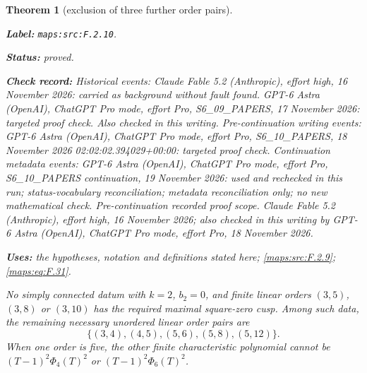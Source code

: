 \documentclass[11pt,a4paper]{article}
\newtheorem{theorem}{Theorem}[section]
\theoremstyle{definition}
\newcommand{\StatementRecord}[4]{\par\smallskip\begingroup\upshape\raggedright\noindent\textbf{Label:} \nolinkurl{#1}.\par\noindent\textbf{Status:} #2.\par\noindent\textbf{Check record:} #3.\par\noindent\textbf{Uses:} #4.\par\endgroup\smallskip}
\begin{document}
\begin{theorem}[exclusion of three further order pairs]\label{maps:src:F.2.10}
\StatementRecord{maps:src:F.2.10}{proved}{Historical events: Claude Fable 5.2 (Anthropic), effort high, 16 November 2026: carried as background without fault found. GPT-6 Astra (OpenAI), ChatGPT Pro mode, effort Pro, S6\_09\_PAPERS, 17 November 2026: targeted proof check. Also checked in this writing. Pre-continuation writing events: GPT-6 Astra (OpenAI), ChatGPT Pro mode, effort Pro, S6\_10\_PAPERS, 18 November 2026 02:02:02.394029+00:00: targeted proof check. Continuation metadata events: GPT-6 Astra (OpenAI), ChatGPT Pro mode, effort Pro, S6\_10\_PAPERS continuation, 19 November 2026: used and rechecked in this run; status-vocabulary reconciliation; metadata reconciliation only; no new mathematical check. \emph{Pre-continuation recorded proof scope.} Claude Fable 5.2 (Anthropic), effort high, 16 November 2026; also checked in this writing by GPT-6 Astra (OpenAI), ChatGPT Pro mode, effort Pro, 18 November 2026}{the hypotheses, notation and definitions stated here; \cref{maps:src:F.2.9}; \cref{maps:eq:F.31}}


No simply connected datum with $k=2$, $b_2=0$, and finite linear orders
$(3,5)$, $(3,8)$ or $(3,10)$ has the required maximal
square-zero cusp.  Among such data, the
remaining necessary unordered linear order pairs are
\[
 \{(3,4),(4,5),(5,6),(5,8),(5,12)\}.
 \tag{F.30}\label{maps:eq:F.30}
\]
When one order is five, the other finite characteristic
polynomial cannot be $(T-1)^2\Phi_4(T)^2$ or
$(T-1)^2\Phi_6(T)^2$.

\end{theorem}
\end{document}
